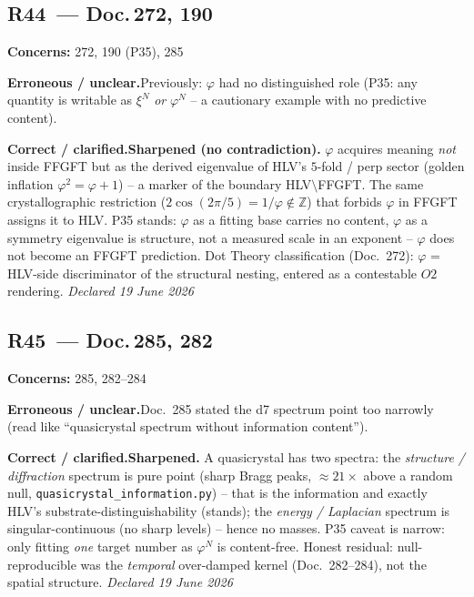 \medskip


\subsection*{R44~--- Doc.\,272, 190}

\noindent\textbf{Concerns:} 272, 190 (P35), 285


\smallskip\noindent\textbf{Erroneous / unclear.}\quad Previously: $\varphi$ had no distinguished role (P35: any quantity is writable as $\xi^N$ \emph{or} $\varphi^N$ -- a cautionary example with no predictive content).


\smallskip\noindent\textbf{Correct / clarified.}\quad \textbf{Sharpened (no contradiction).} $\varphi$ acquires meaning \emph{not} inside FFGFT but as the derived eigenvalue of HLV's $5$-fold / perp sector (golden inflation $\varphi^2=\varphi+1$) -- a marker of the boundary HLV$\setminus$FFGFT. The same crystallographic restriction ($2\cos(2\pi/5)=1/\varphi\notin\mathbb{Z}$) that forbids $\varphi$ in FFGFT assigns it to HLV. P35 stands: $\varphi$ as a fitting base carries no content, $\varphi$ as a symmetry eigenvalue is structure, not a measured scale in an exponent -- $\varphi$ does not become an FFGFT prediction. Dot Theory classification (Doc.~272): $\varphi$ = HLV-side discriminator of the structural nesting, entered as a contestable $O2$ rendering. \emph{Declared 19 June 2026}


\medskip


\subsection*{R45~--- Doc.\,285, 282}

\noindent\textbf{Concerns:} 285, 282--284


\smallskip\noindent\textbf{Erroneous / unclear.}\quad Doc.~285 stated the d7 spectrum point too narrowly (read like ``quasicrystal spectrum without information content'').


\smallskip\noindent\textbf{Correct / clarified.}\quad \textbf{Sharpened.} A quasicrystal has two spectra: the \emph{structure / diffraction} spectrum is pure point (sharp Bragg peaks, $\approx21\times$ above a random null, \texttt{quasicrystal\_information.py}) -- that is the information and exactly HLV's substrate-distinguishability (stands); the \emph{energy / Laplacian} spectrum is singular-continuous (no sharp levels) -- hence no masses. P35 caveat is narrow: only fitting \emph{one} target number as $\varphi^N$ is content-free. Honest residual: null-reproducible was the \emph{temporal} over-damped kernel (Doc.~282--284), not the spatial structure. \emph{Declared 19 June 2026}


